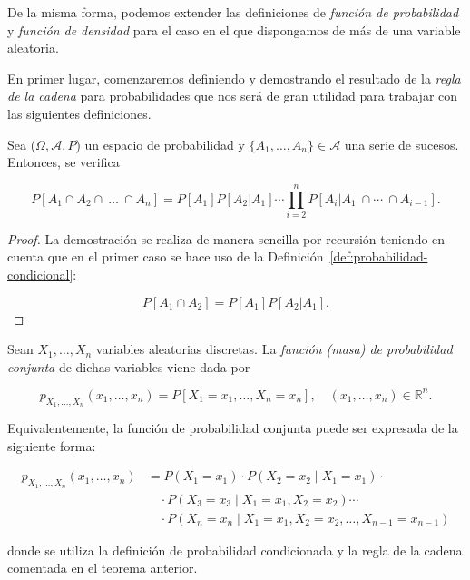 De la misma forma, podemos extender las definiciones de \emph{función de probabilidad} y \emph{función de densidad} para el caso en el que dispongamos de más de una variable aleatoria.\newline

En primer lugar, comenzaremos definiendo y demostrando el resultado de la \emph{regla de la cadena} para probabilidades que nos será de gran utilidad para trabajar con las siguientes definiciones.\newline

\begin{teorema}
    Sea ($\Omega, \mathcal{A}, P$) un espacio de probabilidad y $\{A_1, \ldots, A_n \} \in \mathcal{A}$ una serie de sucesos. Entonces, se verifica

    \[ P[A_1 \cap A_2 \cap \ \ldots \ \cap A_n] =  P[A_1]P[A_2 | A_1]\cdots \prod_{i=2}^n P[A_i | A_1 \ \cap \cdots \ \cap A_{i-1}]. \]\newline
\end{teorema}

\begin{proof}
    La demostración se realiza de manera sencilla por recursión teniendo en cuenta que en el primer caso se hace uso de la Definición~\ref{def:probabilidad-condicional}:

    \[ P[A_1 \cap A_2] = P[A_1]P[A_2| A_1]. \]\newline
\end{proof}

\begin{definicion}
    Sean $X_1, \ldots, X_n$ variables aleatorias discretas. La \emph{función (masa) de probabilidad conjunta} de dichas variables viene dada por

    \[ p_{X_1, \ldots, X_n}(x_1, \ldots, x_n) = P[X_1 = x_1, \ldots, X_n = x_n], \quad (x_1, \ldots, x_n) \in \mathbb{R}^n. \]

    Equivalentemente, la función de probabilidad conjunta puede ser expresada de la siguiente forma:

    \begin{align*}
        p_{X_1, \dots, X_n}(x_1, \dots, x_n) &= P(X_1 = x_1) \cdot P(X_2 = x_2 \mid X_1 = x_1) \cdot \\
        &\quad \cdot P(X_3 = x_3 \mid X_1 = x_1, X_2 = x_2) \cdots \\
        &\quad \cdot P(X_n = x_n \mid X_1 = x_1, X_2 = x_2, \dots, X_{n-1} = x_{n-1})
    \end{align*}

    donde se utiliza la definición de probabilidad condicionada y la regla de la cadena comentada en el teorema anterior.\newline
\end{definicion}

